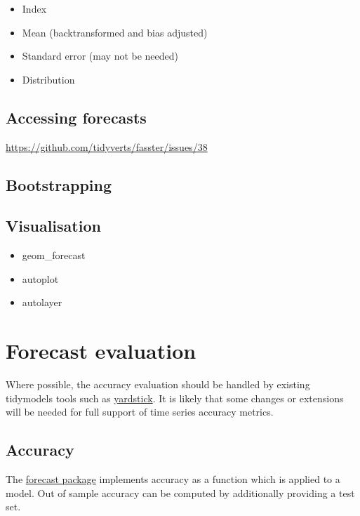 \documentclass[]{book}
\providecommand{\tightlist}{%
  \setlength{\itemsep}{0pt}\setlength{\parskip}{0pt}}
\begin{document}
\begin{itemize}
\tightlist
\item
  Index
\item
  Mean (backtransformed and bias adjusted)
\item
  Standard error (may not be needed)
\item
  Distribution
\end{itemize}

\hypertarget{accessing-forecasts}{%
\section{Accessing forecasts}\label{accessing-forecasts}}

\url{https://github.com/tidyverts/fasster/issues/38}

\hypertarget{bootstrapping}{%
\section{Bootstrapping}\label{bootstrapping}}

\hypertarget{visualisation-1}{%
\section{Visualisation}\label{visualisation-1}}

\begin{itemize}
\tightlist
\item
  geom\_forecast
\item
  autoplot
\item
  autolayer
\end{itemize}

\hypertarget{accuracy}{%
\chapter{Forecast evaluation}\label{accuracy}}

Where possible, the accuracy evaluation should be handled by existing tidymodels tools such as \href{https://tidymodels.github.io/yardstick/}{yardstick}. It is likely that some changes or extensions will be needed for full support of time series accuracy metrics.

\hypertarget{accuracy-1}{%
\section{Accuracy}\label{accuracy-1}}

The \href{https://github.com/robjhyndman/forecast/}{forecast package} implements accuracy as a function which is applied to a model. Out of sample accuracy can be computed by additionally providing a test set.
\end{document}
